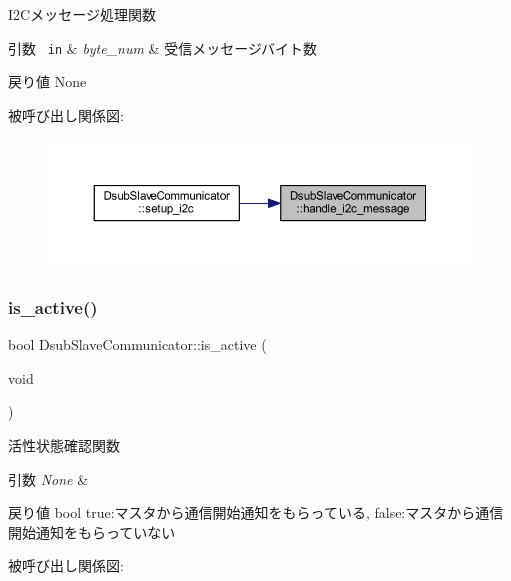 I2\+Cメッセージ処理関数 


\begin{DoxyParams}[1]{引数}
\mbox{\texttt{ in}}  & {\em byte\+\_\+num} & 受信メッセージバイト数 \\
\hline
\end{DoxyParams}
\begin{DoxyReturn}{戻り値}
None 
\end{DoxyReturn}
被呼び出し関係図\+:\nopagebreak
\begin{figure}[H]
\begin{center}
\leavevmode
\includegraphics[width=350pt]{class_dsub_slave_communicator_ad2b7d6a48942a55bea5f095da31eb683_icgraph}
\end{center}
\end{figure}
\mbox{\label{class_dsub_slave_communicator_a7a7d6e43b95833e698761442b0741e72}} 
\subsubsection{\texorpdfstring{is\_active()}{is\_active()}}
{\footnotesize\ttfamily bool Dsub\+Slave\+Communicator\+::is\+\_\+active (\begin{DoxyParamCaption}\item[{void}]{ }\end{DoxyParamCaption})\hspace{0.3cm}{\ttfamily [static]}}



活性状態確認関数 


\begin{DoxyParams}{引数}
{\em None} & \\
\hline
\end{DoxyParams}
\begin{DoxyReturn}{戻り値}
bool true\+:マスタから通信開始通知をもらっている, false\+:マスタから通信開始通知をもらっていない 
\end{DoxyReturn}
被呼び出し関係図\+:
\mbox{\label{class_dsub_slave_communicator_a0a49728ad2bec47e0cb6e6ee93f0182b}} 
